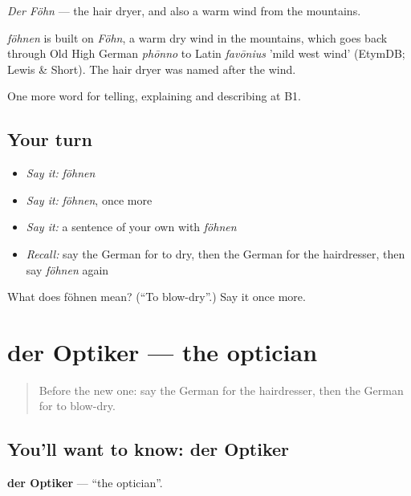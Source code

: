 \emph{Der Föhn} — the hair dryer, and also a warm wind from the mountains.

\begin{cousinweb}
\emph{föhnen} is built on \emph{Föhn}, a warm dry wind in the mountains, which goes back through Old High German \emph{phōnno} to Latin \emph{favōnius} 'mild west wind' (EtymDB; Lewis \& Short). The hair dryer was named after the wind.
\end{cousinweb}

\begin{grammarlens}[title={What you've built}]
One more word for telling, explaining and describing at B1.
\end{grammarlens}

\subsection*{Your turn}
\begin{itemize}
\raggedright
  \item \emph{Say it:} \emph{föhnen}
  \item \emph{Say it:} \emph{föhnen}, once more
  \item \emph{Say it:} a sentence of your own with \emph{föhnen}
  \item \emph{Recall:} say the German for to dry, then the German for the hairdresser, then say \emph{föhnen} again
\end{itemize}

\begin{tcolorbox}[breakable,colback=teal!4,colframe=teal!35!black,title={Before you move on}]
What does föhnen mean? (\textquotedblleft{}To blow-dry\textquotedblright{}.) Say it once more.
\end{tcolorbox}
\section[der Optiker]{der Optiker — the optician}

\label{lesson:GE-C447-optiker}



\begin{quote}
Before the new one: say the German for the hairdresser, then the German for to blow-dry.
\end{quote}

\subsection*{You'll want to know: der Optiker}
\textbf{der Optiker} — \textquotedblleft{}the optician\textquotedblright{}.

